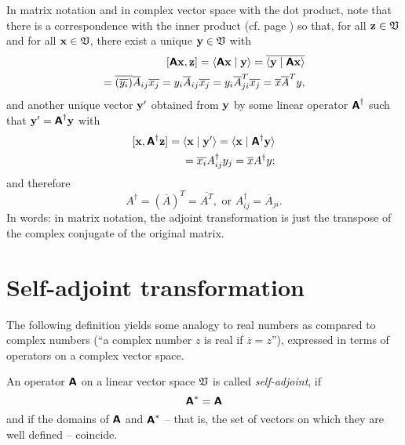 In matrix notation and in complex vector space with the dot product,
note that there is a correspondence with the inner product
(cf. page \pageref{2011-m-corr-bil-ip})
so that, for all ${\bf z}\in {\frak V}$ and for all ${\bf x}\in {\frak V}$,
 there exist a unique ${\bf y}\in {\frak V}$ with
\begin{equation}
\begin{split}
[\textsf{\textbf{A}}{\bf x}, {\bf z}] =\langle \textsf{\textbf{A}} {\bf x}\mid {\bf y}\rangle
=\overline{ \langle{\bf y}\mid \textsf{\textbf{A}} {\bf x}\rangle }   \\
 = \overline{ \left( \overline{ y_i} \right) } \overline{ A}_{ij} \overline{ x_j}   = y_i\overline{ A}_{ij} \overline{ x_j}
 = y_i\overline{ A}_{ji}^T \overline{ x_j }    = \overline{ x }\overline{ A}^T y,
\end{split}
\end{equation}
and another unique vector ${\bf y}'$ obtained from ${\bf y}$ by
some linear operator $\textsf{\textbf{A}}^\dagger$
such that ${\bf y}'=\textsf{\textbf{A}}^\dagger {\bf y}$ with
\begin{equation}
\begin{split}
[{\bf x}, \textsf{\textbf{A}}^\dagger {\bf z}] =
\langle {\bf x}\mid {\bf y}'\rangle         =
\langle {\bf x}\mid \textsf{\textbf{A}}^\dagger {\bf y}\rangle        \\
 = \overline{ x_i } A_{ij}^\dagger y_j      =   \overline{ x }A ^\dagger y;
\end{split}
\end{equation}
and therefore
\begin{equation}
A ^\dagger =(\overline{ A})^T =\overline{ A^T}, \textrm{ or } A^\dagger_{ij}=\overline{A}_{ji} .
\end{equation}
In words: in matrix notation, the adjoint transformation is just the
transpose of the complex conjugate of the original matrix.

\section{Self-adjoint transformation}



The following definition yields some analogy to real numbers as compared to complex numbers
(``a complex number $z$ is real if $\overline{z}=z$''),
expressed in terms of operators on a complex vector space.


An operator    $\textsf{\textbf{A}}$   on a linear vector space   ${\frak V}$
is called {\em self-adjoint}, if
\begin{equation}
\textsf{\textbf{A}}^{\ast}=
\textsf{\textbf{A}}
\end{equation}
and if the domains of $\textsf{\textbf{A}}$ and $\textsf{\textbf{A}}^{\ast}$
-- that is, the set of vectors on which they are well defined -- coincide.

